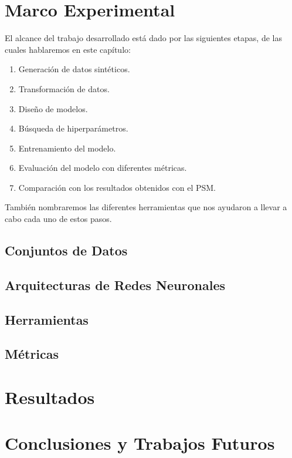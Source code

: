 \documentclass[a4paper,12pt,spanish]{book}
\begin{document}
\chapter{Marco Experimental}
El alcance del trabajo desarrollado está dado por las siguientes etapas, de las
cuales hablaremos en este capítulo:
\begin{enumerate}[noitemsep, label=\textbf{\arabic*.}]
    \item Generación de datos sintéticos.
    \item Transformación de datos.
    \item Diseño de modelos.
    \item Búsqueda de hiperparámetros.
    \item Entrenamiento del modelo.
    \item Evaluación del modelo con diferentes métricas.
    \item Comparación con los resultados obtenidos con el PSM.
\end{enumerate}

También nombraremos las diferentes herramientas que nos ayudaron a llevar a cabo
cada uno de estos pasos.

\section{Conjuntos de Datos}


\section{Arquitecturas de Redes Neuronales}


\section{Herramientas}


\section{Métricas}


\chapter{Resultados}


\chapter{Conclusiones y Trabajos Futuros}
\end{document}
